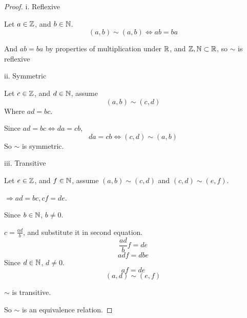 \documentclass[12pt]{article}
\begin{document}
\begin{proof}
i. Reflexive 

Let $a\in \mathbb{Z}$, and $b\in \mathbb{N}$.
\[(a,b)\sim (a,b)\iff ab = ba\]

And $ab = ba$ by properties of multiplication under $\mathbb{R}$, and $\mathbb{Z},\mathbb{N} \subset \mathbb{R}$, so $\sim$ is reflexive

ii. Symmetric

Let $c\in \mathbb{Z}$, and $d\in \mathbb{N}$, assume
\[(a,b)\sim (c,d)\]
Where $ad = bc$.

Since $ad = bc \iff da = cb$,
\[da = cb\iff (c,d)\sim (a,b)\]
So $\sim$ is symmetric.

iii. Transitive

Let $e\in \mathbb{Z}$, and $f\in \mathbb{N}$, assume $(a,b)\sim (c,d)$ and $(c,d) \sim (e,f)$.

$\Rightarrow ad = bc, cf = de$.

Since $b \in \mathbb{N}$, $b \neq 0$.

$c= \frac{ad}{b}$, and substitute it in second equation.
\[\frac{ad}{b}f = de\]
\[adf = dbe\]
Since $d\in \mathbb{N}$, $d \neq 0$.
\[af = de\]
\[
(a,d) \sim (e,f)
\]

$\sim$ is transitive.

So $\sim$ is an equivalence relation.

\end{proof}
\vfill
\end{document}
